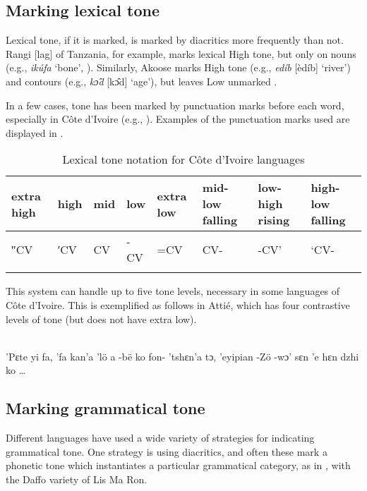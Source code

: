 \documentclass[output=paper]{langscibook}
\begin{document}
  \subsection{Marking lexical tone} 
  \label{sec:HowToneMarked:MarkLexical:2}
    Lexical tone, if it is marked, is marked by diacritics more frequently than not. Rangi [lag] of Tanzania, for example, marks lexical High tone, but only on nouns (e.g., \textit{ikúfa} ‘bone’, \citealt{Stegen2005}). Similarly, Akoose marks High tone (e.g., \textit{edíb} [èdíb] ‘river’) and contours (e.g., \textit{kɔ̂d}  [kɔ̂d] ‘age’), but leaves Low unmarked \citep[13]{Hedinger2011}.

    In a few cases, tone has been marked by punctuation marks before each word, especially in Côte d’Ivoire (e.g., \citealt{Bolli1978}). Examples of the punctuation marks used are displayed in .

    
    \begin{table}
      \begin{tabularx}{\textwidth}{XXXXXXXX}
      \lsptoprule
      extra high & high & mid & low & extra low & mid-low falling & low-high rising & high-low falling\\\midrule
      ″CV & ′CV & CV & {}-CV & =CV & CV- & {}-CV’ & ‘CV-\\
      \lspbottomrule
      \end{tabularx}
      \caption{Lexical tone notation for Côte d’Ivoire languages \citep[58]{Kutsch2014}\label{tab:cahill:LexicalToneNotationCoteLang:9}}
    \end{table}

    This system can handle up to five tone levels, necessary in some languages of Côte d’Ivoire. This is exemplified as follows in Attié, which has four contrastive levels of tone (but does not have extra low).

    \ea \label{ex:AttieContrastiveTone:1}
    \\
    \glt 'Pɛte {\textquotedbl}yi {\textquotedbl}fa, 'fa {\textquotedbl}kan'a 'lö {\textquotedbl}a -bë ko fon- 'tshɛn'a tɔ, 'eyipian -Zö -wɔ' sɛn  'e hɛn dzhi ko \ldots    
    \z

  

  \subsection{Marking grammatical tone} 
  \label{sec:HowToneMarked:MarkGrammatical:3}
    Different languages have used a wide variety of strategies for indicating grammatical tone. One strategy is using diacritics, and often these mark a phonetic tone which instantiates a particular grammatical category, as in , with the Daffo variety of Lis Ma Ron.
\end{document}
